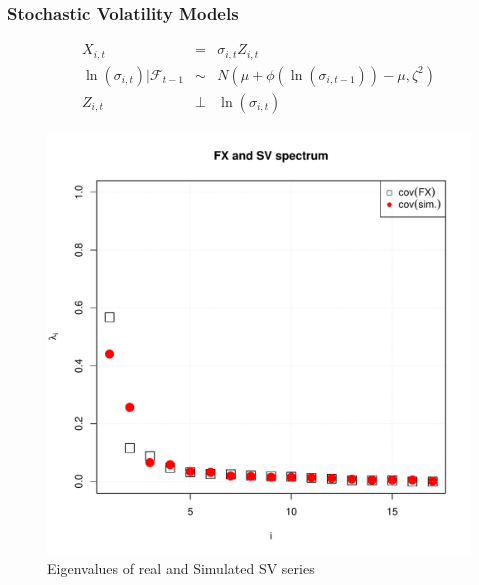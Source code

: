 \documentclass{beamer}
\begin{document}
\begin{frame}
  \frametitle{Stochastic Volatility Models}
  \begin{minipage}{0.6\linewidth}
    \begin{scriptsize}
      \begin{eqnarray*}
        X_{i, t} &=& \sigma_{i, t} Z_{i,t} \\
        \ln(\sigma_{i,t})|\mathcal F_{t-1} &\sim& N(\mu + \phi(\ln(\sigma_{i,t-1})) - \mu, \zeta^2)\\
        Z_{i, t} &\bot& \ln(\sigma_{i,t})
      \end{eqnarray*}
    \end{scriptsize}
  \end{minipage}\hfill
  \begin{minipage}{0.4\linewidth}
    \begin{figure}[htb!]
      \centering
      \includegraphics[width=1.0\linewidth]{FX_sv_eigenvalues.pdf}
      \caption{\scriptsize Eigenvalues of real and Simulated SV series}
    \end{figure}
  \end{minipage}
\end{frame}
\end{document}
